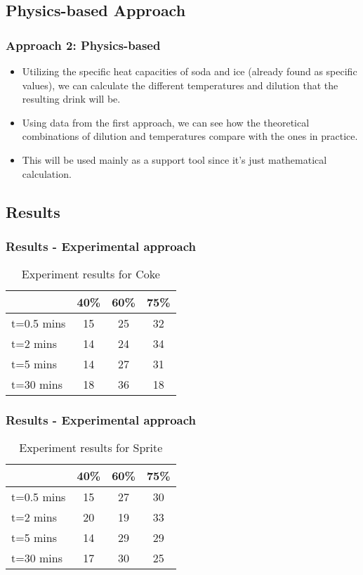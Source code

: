\documentclass[compress,handout,10pt]{beamer}
\let\olditem\item
\renewcommand{\item}{\setlength{\itemsep}{0.5\baselineskip}\olditem}
\begin{document}
\subsection{Physics-based Approach}
\begin{frame}
    \frametitle{Approach 2: Physics-based}

\begin {itemize}
\item Utilizing the specific heat capacities of soda and ice (already found as specific values), we can calculate the different temperatures and dilution that the resulting drink will be.
\item Using data from the first approach, we can see how the theoretical combinations of dilution and temperatures compare with the ones in practice.
\item This will be used mainly as a support tool since it's just mathematical calculation.
\end{itemize}

\end{frame}

\subsection{Results}
\begin{frame}
    \frametitle{Results - Experimental approach}

\begin{table}[ h]
\centering
\begin{tabular}{ l || c|c|c }
  &40\% &60\% & 75\%  \\
\hline  
t=0.5 mins & 15 & 25 & 32\\ 
\hline  
t=2 mins & 14 & 24 & 34\\ 
\hline  
t=5 mins & 14 & 27 & 31\\ 
\hline  
t=30 mins & 18 & 36 & 18\\ 
\hline  
   
 \end{tabular}

\caption{Experiment results for Coke}

\end{table}
\end{frame}

\begin{frame}
    \frametitle{Results - Experimental approach}

\begin{table}[ h]
\centering
\begin{tabular}{ l || c|c|c }
  &40\% &60\% & 75\%  \\
\hline  
t=0.5 mins & 15 & 27 & 30\\ 
\hline  
t=2 mins & 20 & 19 & 33\\ 
\hline  
t=5 mins & 14 & 29 & 29\\ 
\hline  
t=30 mins & 17 & 30 & 25\\ 
\hline  
   
 \end{tabular}

\caption{Experiment results for Sprite}

\end{table}
\end{frame}
\end{document}

